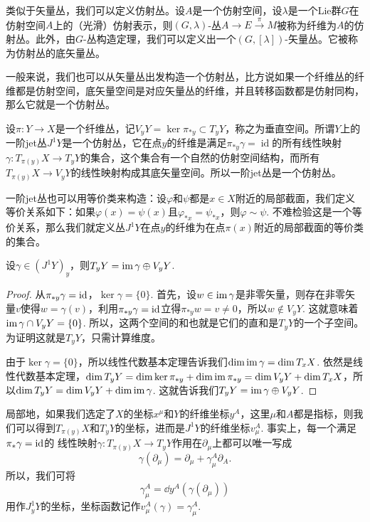 \begin{para}[仿射丛]
    类似于矢量丛，我们可以定义仿射丛。设$A$是一个仿射空间，设$\lambda$是一个Lie群$G$在仿射空间$A$上的（光滑）仿射表示，则$(G,\lambda)$-丛$A\to E\xrightarrow{\pi} M$被称为纤维为$A$的仿射丛。此外，由$G$-丛构造定理，我们可以定义出一个$(G,[\lambda])$-矢量丛。它被称为仿射丛的底矢量丛。
\end{para}

一般来说，我们也可以从矢量丛出发构造一个仿射丛，比方说如果一个纤维丛的纤维都是仿射空间，底矢量空间是对应矢量丛的纤维，并且转移函数都是仿射同构，那么它就是一个仿射丛。

\begin{para}[一阶jet丛]
    设$\pi:Y\to X$是一个纤维丛，记$V_yY=\ker\pi_{*y}\subset T_yY$，称之为垂直空间。所谓$Y$上的一阶jet丛$J^1Y$是一个仿射丛，它在点$y$的纤维是满足$\pi_{*y}\gamma=\operatorname{id}$的所有线性映射$\gamma:T_{\pi(y)}X\to T_yY$的集合，这个集合有一个自然的仿射空间结构，而所有$T_{\pi(y)}X\to V_yY$的线性映射构成其底矢量空间。所以一阶jet丛是一个仿射丛。

    一阶jet丛也可以用等价类来构造：设$\varphi$和$\psi$都是$x\in X$附近的局部截面，我们定义等价关系如下：如果$\varphi(x)=\psi(x)$且$\varphi_{*x}=\psi_{*x}$，则$\varphi\sim \psi$. 不难检验这是一个等价关系，那么我们就定义丛$J^1Y$在点$y$的纤维为在点$\pi(x)$附近的局部截面的等价类的集合。
\end{para}

\begin{lem}
    设$\gamma\in (J^1Y)_y$，则$T_yY=\operatorname{im}\gamma\oplus V_yY$.
\end{lem}

\begin{proof}
    从$\pi_{*y}\gamma=\operatorname{id}$，$\ker \gamma=\{0\}$. 首先，设$w\in \operatorname{im}\gamma$是非零矢量，则存在非零矢量$v$使得$w=\gamma(v)$，利用$\pi_{*y}\gamma=\operatorname{id}$立得$\pi_{*y}w=v\neq 0$，所以$w\not\in  V_yY$. 这就意味着$\operatorname{im}\gamma\cap V_yY=\{0\}$. 所以，这两个空间的和也就是它们的直和是$T_yY$的一个子空间。为证明这就是$T_yY$，只需计算维度。

    由于$\ker \gamma=\{0\}$，所以线性代数基本定理告诉我们$\dim \operatorname{im}\gamma=\dim T_xX$. 依然是线性代数基本定理，$\dim T_yY=\dim \ker \pi_{*y}+\dim \operatorname{im} \pi_{*y}=\dim V_yY+\dim T_xX$，所以$\dim T_yY=\dim V_yY+\dim \operatorname{im}\gamma$. 这就告诉我们$T_yY=\operatorname{im}\gamma\oplus V_yY$.
\end{proof}

局部地，如果我们选定了$X$的坐标$x^\mu$和$Y$的纤维坐标$y^A$，这里$\mu$和$A$都是指标，则我们可以得到$T_{\pi(y)}X$和$T_yY$的坐标，进而是$J^1Y$的纤维坐标$v^{A}_\mu$. 事实上，每一个满足$\pi_*\gamma=\operatorname{id}$的
线性映射$\gamma:T_{\pi(y)}X\to T_yY$作用在$\partial_\mu$上都可以唯一写成
\[
    \gamma(\partial_\mu)=\partial_\mu+\gamma^A_{\mu}\partial_A.
\]
所以，我们可将
\begin{equation}
	\gamma^A_{\mu}=\dd y^A(\gamma(\partial_\mu))
\end{equation}
用作$J^1_y Y$的坐标，坐标函数记作$v^A_\mu(\gamma)=\gamma^A_{\mu}$. 

